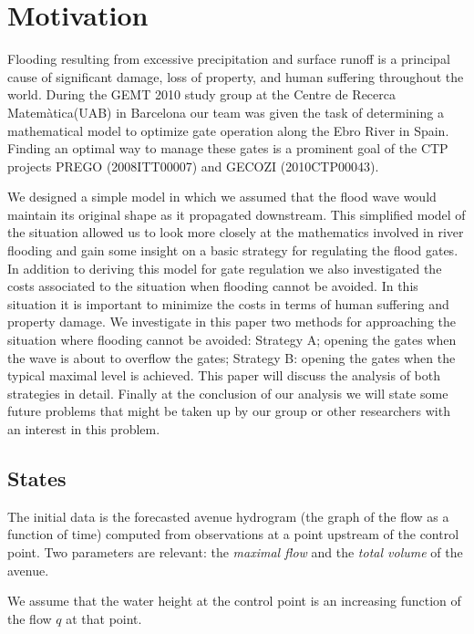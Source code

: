 \def\erf{\mathord{\rm erf}}
\def\q#1{q_{\mbox{\scriptsize #1}}}
\def\tp{t_{+}}
\def\tm{t_{-}}
\def\ppart#1{\left[#1\right]_{+}}

\section{Motivation} %

Flooding resulting from excessive precipitation and surface runoff is a principal cause of significant damage, loss of property, and human suffering throughout the world.  During the GEMT 2010 study group at the Centre de Recerca Matem\`atica(UAB) in Barcelona our team was given the task of determining a mathematical model to optimize gate operation along the Ebro River in Spain.
Finding an optimal way to manage these gates is a prominent goal of the CTP projects PREGO (2008ITT00007) and GECOZI (2010CTP00043).

We designed a simple model in which we assumed that the flood wave would maintain its original shape as it propagated downstream.  This simplified model of the situation allowed us to look more closely at the mathematics involved in river flooding and gain some insight on a basic strategy for regulating the flood gates.  In addition to deriving this model for gate regulation we also investigated the costs associated to the situation when flooding cannot be avoided.  In this situation it is important to minimize the costs in terms of human suffering and property damage.  We investigate in this paper two methods for approaching the situation where flooding cannot be avoided: Strategy A; opening the gates when the wave is about to overflow the gates; Strategy B: opening the gates when the typical maximal level is achieved.
This paper will discuss the analysis of both strategies in detail.  Finally at the conclusion of our analysis we will state some future problems that might be taken up by our group or other researchers with an interest in this problem.

\subsection{States} 

The initial data is the forecasted avenue hydrogram (the graph of
the flow as a function of time) computed from observations at a point
upstream of the control point. Two parameters are relevant: the \emph{maximal
flow} and the \emph{total volume} of the avenue.

We assume that the water height  at the control point is an increasing
function of the flow $q$ at that point.

